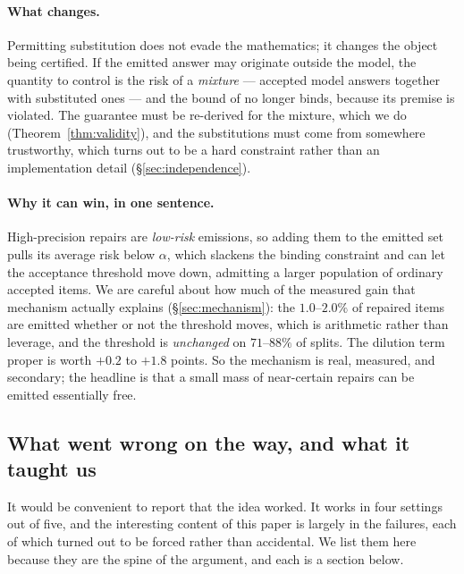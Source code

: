 \documentclass{article}
\theoremstyle{plain}
\theoremstyle{definition}
\theoremstyle{remark}
\begin{document}
\paragraph{What changes.}
Permitting substitution does not evade the mathematics; it changes the object being
certified. If the emitted answer may originate outside the model, the quantity to control
is the risk of a \emph{mixture} --- accepted model answers together with substituted ones
--- and the bound of \citet{crcimposs} no longer binds, because its premise is violated.
The guarantee must be re-derived for the mixture, which we do
(Theorem~\ref{thm:validity}), and the substitutions must come from somewhere trustworthy,
which turns out to be a hard constraint rather than an implementation detail
(\S\ref{sec:independence}).

\paragraph{Why it can win, in one sentence.}
High-precision repairs are \emph{low-risk} emissions, so adding them to the emitted set
pulls its average risk below $\alpha$, which slackens the binding constraint and can let the
acceptance threshold move down, admitting a larger population of ordinary accepted items. We
are careful about how much of the measured gain that mechanism actually explains
(\S\ref{sec:mechanism}): the $1.0$--$2.0\%$ of repaired items are emitted whether or not the
threshold moves, which is arithmetic rather than leverage, and the threshold is
\emph{unchanged} on $71$--$88\%$ of splits. The dilution term proper is worth $+0.2$ to
$+1.8$ points. So the mechanism is real, measured, and secondary; the headline is that a
small mass of near-certain repairs can be emitted essentially free.

\subsection{What went wrong on the way, and what it taught us}

It would be convenient to report that the idea worked. It works in four settings out of
five, and the interesting content of this paper is largely in the failures, each of which
turned out to be forced rather than accidental. We list them here because they are the
spine of the argument, and each is a section below.
\end{document}
